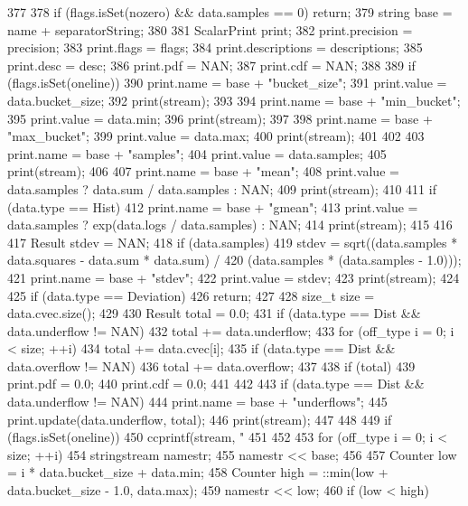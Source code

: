 \begin{DoxyCode}
377 {
378     if (flags.isSet(nozero) && data.samples == 0) return;
379     string base = name + separatorString;
380 
381     ScalarPrint print;
382     print.precision = precision;
383     print.flags = flags;
384     print.descriptions = descriptions;
385     print.desc = desc;
386     print.pdf = NAN;
387     print.cdf = NAN;
388 
389     if (flags.isSet(oneline)) {
390         print.name = base + "bucket_size";
391         print.value = data.bucket_size;
392         print(stream);
393 
394         print.name = base + "min_bucket";
395         print.value = data.min;
396         print(stream);
397 
398         print.name = base + "max_bucket";
399         print.value = data.max;
400         print(stream);
401     }
402 
403     print.name = base + "samples";
404     print.value = data.samples;
405     print(stream);
406 
407     print.name = base + "mean";
408     print.value = data.samples ? data.sum / data.samples : NAN;
409     print(stream);
410 
411     if (data.type == Hist) {
412         print.name = base + "gmean";
413         print.value = data.samples ? exp(data.logs / data.samples) : NAN;
414         print(stream);
415     }
416 
417     Result stdev = NAN;
418     if (data.samples)
419         stdev = sqrt((data.samples * data.squares - data.sum * data.sum) /
420                      (data.samples * (data.samples - 1.0)));
421     print.name = base + "stdev";
422     print.value = stdev;
423     print(stream);
424 
425     if (data.type == Deviation)
426         return;
427 
428     size_t size = data.cvec.size();
429 
430     Result total = 0.0;
431     if (data.type == Dist && data.underflow != NAN)
432         total += data.underflow;
433     for (off_type i = 0; i < size; ++i)
434         total += data.cvec[i];
435     if (data.type == Dist && data.overflow != NAN)
436         total += data.overflow;
437 
438     if (total) {
439         print.pdf = 0.0;
440         print.cdf = 0.0;
441     }
442 
443     if (data.type == Dist && data.underflow != NAN) {
444         print.name = base + "underflows";
445         print.update(data.underflow, total);
446         print(stream);
447     }
448 
449     if (flags.isSet(oneline)) {
450         ccprintf(stream, "%
451     }
452 
453     for (off_type i = 0; i < size; ++i) {
454         stringstream namestr;
455         namestr << base;
456 
457         Counter low = i * data.bucket_size + data.min;
458         Counter high = ::min(low + data.bucket_size - 1.0, data.max);
459         namestr << low;
460         if (low < high)
}}
\end{DoxyCode}
